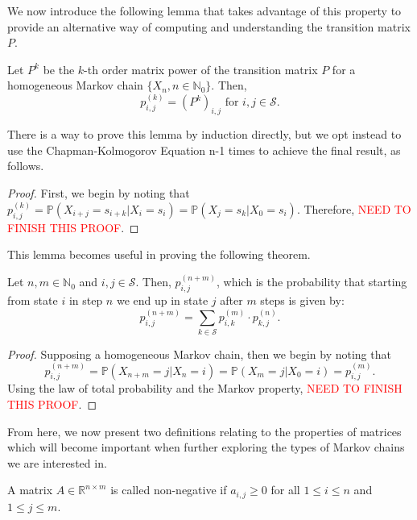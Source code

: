We now introduce the following lemma that takes advantage of this property to provide an alternative way of computing and understanding the transition matrix $P$. 

\begin{lemma}
	Let $P^k$ be the $k$-th order matrix power of the transition matrix $P$ for a homogeneous Markov chain $\{ X_n, n \in \mathbb{N}_0 \}$. Then, 
	\[ p_{i,j}^{(k)} = (P^k)_{i,j} \text{ for } i,j \in \mathcal{S}. \]
\end{lemma}

There is a way to prove this lemma by induction directly, but we opt instead to use the Chapman-Kolmogorov Equation n-1 times to achieve the final result, as follows. 

\begin{proof}
	First, we begin by noting that $p_{i,j}^{(k)} = \mathbb{P}(X_{i+j} = s_{i + k} | X_i = s_i) = \mathbb{P}(X_{j} = s_{k} | X_0 = s_i)$. Therefore, \textcolor{red}{NEED TO FINISH THIS PROOF}. 
	
\end{proof}

This lemma becomes useful in proving the following theorem. 

\begin{theorem}
	Let $n,m \in \mathbb{N}_0$ and $i,j \in \mathcal{S}$. Then, $p_{i,j}^{(n+m)}$, which is the probability that starting from state $i$ in step $n$ we end up in state $j$ after $m$ steps is given by: 
	\[ p_{i,j}^{(n+m)} = \sum_{k \in \mathcal{S}} p_{i,k}^{(m)} \cdot p_{k,j}^{(n)}. \]
\end{theorem}

\begin{proof}
	Supposing a homogeneous Markov chain, then we begin by noting that 
	\[ p_{i,j}^{(n+m)} = \mathbb{P}(X_{n+m} = j | X_n = i) = \mathbb{P}(X_m = j | X_0 = i) = p_{i,j}^{(m)}. \] 
	Using the law of total probability and the Markov property, \textcolor{red}{NEED TO FINISH THIS PROOF}.
\end{proof}

From here, we now present two definitions relating to the properties of matrices which will become important when further exploring the types of Markov chains we are interested in. 

\begin{definition}
	A matrix $A \in \mathbb{R}^{n \times m}$ is called non-negative if $a_{i,j} \geq 0$ for all $1 \leq i \leq n$ and $1 \leq j \leq m$. 
\end{definition}

